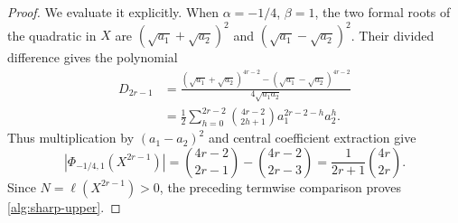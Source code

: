 \begin{proof}
We evaluate it explicitly.  When $\alpha=-1/4$, $\beta=1$, the two
formal roots of the quadratic in $X$ are
$(\sqrt{a_1}+\sqrt{a_2})^2$ and
$(\sqrt{a_1}-\sqrt{a_2})^2$.  Their divided difference gives the
polynomial
\begin{align*}
 D_{2r-1}
 &=\frac{(\sqrt{a_1}+\sqrt{a_2})^{4r-2}
          -(\sqrt{a_1}-\sqrt{a_2})^{4r-2}}
         {4\sqrt{a_1a_2}}\\
 &=\frac12\sum_{h=0}^{2r-2}\binom{4r-2}{2h+1}
                 a_1^{2r-2-h}a_2^h.
\end{align*}
Thus multiplication by $(a_1-a_2)^2$ and central coefficient
extraction give
\[
 \left|\Phi_{-1/4,1}(X^{2r-1})\right|
 =\binom{4r-2}{2r-1}-\binom{4r-2}{2r-3}
 =\frac1{2r+1}\binom{4r}{2r}.
\]
Since $N=\ell(X^{2r-1})>0$, the preceding termwise comparison proves
\eqref{alg:sharp-upper}.
\end{proof}

